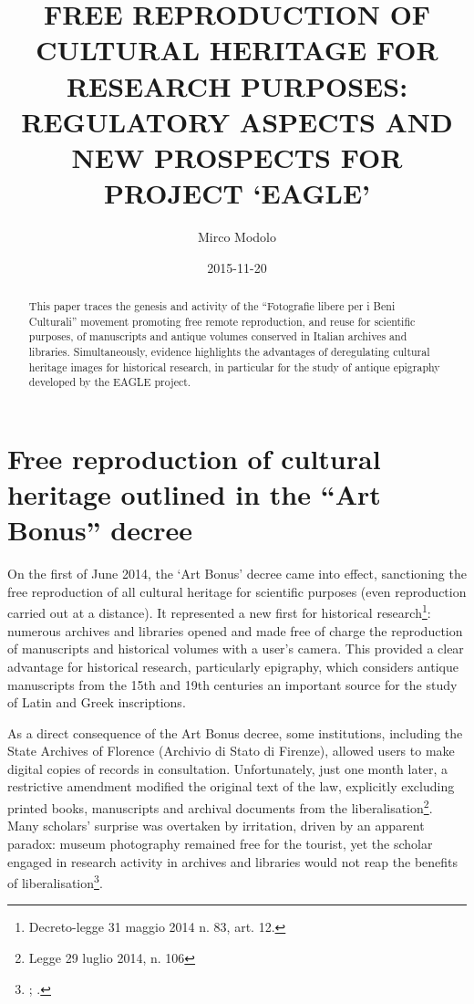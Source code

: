 \documentclass[amsthm,ebook]{saparticle}
\title{FREE REPRODUCTION OF CULTURAL HERITAGE FOR RESEARCH PURPOSES: REGULATORY ASPECTS AND NEW PROSPECTS FOR PROJECT `EAGLE'}
\author[free]{Mirco Modolo\corref{first}}
\date{2015-11-20}
\begin{document}
\maketitle
\begin{abstract}
This paper traces the genesis and activity of the ``Fotografie libere per i Beni Culturali'' movement promoting free
remote reproduction, and reuse for scientific purposes, of manuscripts and antique volumes conserved in Italian
archives and libraries. Simultaneously, evidence highlights the advantages of deregulating cultural heritage images for
historical research, in particular for the study of antique epigraphy developed by the EAGLE project.
\end{abstract}

\section{Free reproduction of cultural heritage outlined in the ``Art Bonus'' decree}


On the first of June 2014, the `Art Bonus' decree came into effect, sanctioning the free reproduction of all cultural
heritage for scientific purposes (even reproduction carried out at a distance). It represented a new first for
historical research\footnote{Decreto-legge 31 maggio 2014 n. 83, art. 12.}: numerous archives and libraries opened
and made free of charge the reproduction of manuscripts and historical volumes with a user’s camera. This provided a
clear advantage for historical research, particularly epigraphy, which considers antique manuscripts from the 15th and
19th centuries an important source for the study of Latin and Greek inscriptions. 

As a direct consequence of the Art Bonus decree, some institutions, including the State Archives of Florence (Archivio
di Stato di Firenze), allowed users to make digital copies of records in consultation. Unfortunately, just one month
later, a restrictive amendment modified the original text of the law, explicitly excluding printed books, manuscripts
and archival documents from the liberalisation\footnote{Legge 29 luglio 2014, n. 106}. Many scholars’ surprise was
overtaken by irritation, driven by an apparent paradox: museum photography remained free for the tourist, yet the
scholar engaged in research activity in archives and libraries would not reap the benefits of
liberalisation\footnote{\citet{modolo_il_2014}; \citet{brugnoli_ancora_2014}. }.
\end{document}
